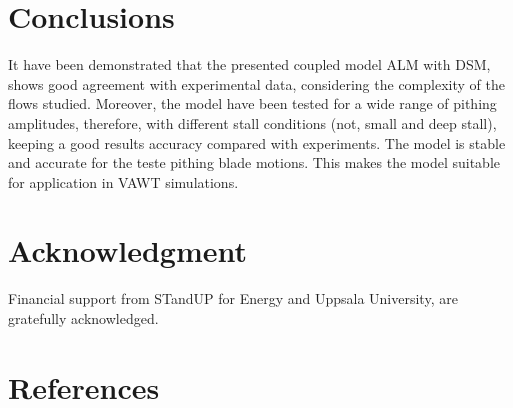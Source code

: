 \documentclass[a4paper]{jpconf}
\begin{document}
\section{Conclusions}
It have been demonstrated that the presented coupled model ALM with DSM, shows good agreement with experimental data, considering the complexity
of the flows studied. Moreover, the model have been tested for a wide range of pithing amplitudes, therefore, with different stall conditions (not, small and deep stall), keeping a good results accuracy compared with experiments. 
The model is stable and accurate for the teste pithing blade motions.
This makes the model suitable for application in VAWT
simulations.


\section*{Acknowledgment}
Financial support from STandUP for Energy and Uppsala University, are gratefully acknowledged. 


\section*{References}

{}

\end{document}
